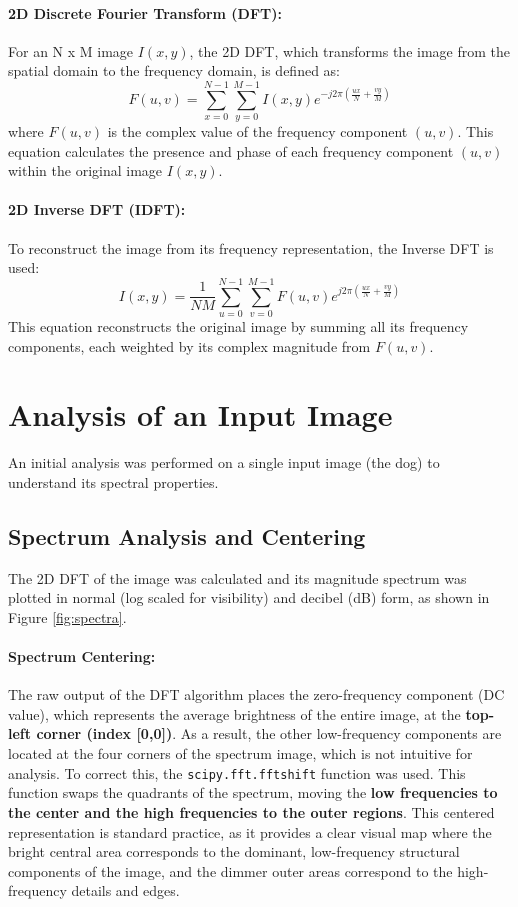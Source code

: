 \documentclass[11pt, a4paper]{article}
\begin{document}
\paragraph{2D Discrete Fourier Transform (DFT):}
For an N x M image \(I(x, y)\), the 2D DFT, which transforms the image from the spatial domain to the frequency domain, is defined as:
\begin{equation}
    F(u, v) = \sum_{x=0}^{N-1} \sum_{y=0}^{M-1} I(x, y) e^{-j2\pi(\frac{ux}{N} + \frac{vy}{M})}
\end{equation}
where \(F(u, v)\) is the complex value of the frequency component \((u, v)\).
This equation calculates the presence and phase of each frequency component \((u,v)\) within the original image \(I(x,y)\).

\paragraph{2D Inverse DFT (IDFT):}
To reconstruct the image from its frequency representation, the Inverse DFT is used:
\begin{equation}
    I(x, y) = \frac{1}{NM} \sum_{u=0}^{N-1} \sum_{v=0}^{M-1} F(u, v) e^{j2\pi(\frac{ux}{N} + \frac{vy}{M})}
\end{equation}
This equation reconstructs the original image by summing all its frequency components, each weighted by its complex magnitude from \(F(u,v)\).

\section{Analysis of an Input Image}
An initial analysis was performed on a single input image (the dog) to understand its spectral properties.

\subsection{Spectrum Analysis and Centering}
The 2D DFT of the image was calculated and its magnitude spectrum was plotted in normal (log scaled for visibility) and decibel (dB) form, as shown in Figure \ref{fig:spectra}.

\paragraph{Spectrum Centering:} The raw output of the DFT algorithm places the zero-frequency component (DC value), which represents the average brightness of the entire image, at the \textbf{top-left corner (index [0,0])}. As a result, the other low-frequency components are located at the four corners of the spectrum image, which is not intuitive for analysis. To correct this, the \texttt{scipy.fft.fftshift} function was used. This function swaps the quadrants of the spectrum, moving the \textbf{low frequencies to the center and the high frequencies to the outer regions}. This centered representation is standard practice, as it provides a clear visual map where the bright central area corresponds to the dominant, low-frequency structural components of the image, and the dimmer outer areas correspond to the high-frequency details and edges.
\end{document}
